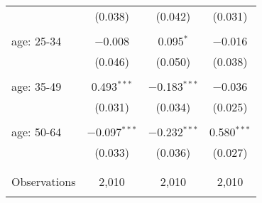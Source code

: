 \begin{tabular}{@{\extracolsep{5pt}}lccc}
  & (0.038) & (0.042) & (0.031) \\ 
  & & & \\ 
 age: 25-34 & $-$0.008 & 0.095$^{*}$ & $-$0.016 \\ 
  & (0.046) & (0.050) & (0.038) \\ 
  & & & \\ 
 age: 35-49 & 0.493$^{***}$ & $-$0.183$^{***}$ & $-$0.036 \\ 
  & (0.031) & (0.034) & (0.025) \\ 
  & & & \\ 
 age: 50-64 & $-$0.097$^{***}$ & $-$0.232$^{***}$ & 0.580$^{***}$ \\ 
  & (0.033) & (0.036) & (0.027) \\ 
  & & & \\ 
\hline \\[-1.8ex] 

Observations & 2,010 & 2,010 & 2,010 \\ 
\hline 
\hline \\[-1.8ex] 
\end{tabular} 